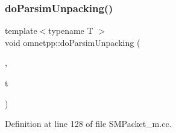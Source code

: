 \subsubsection{\texorpdfstring{do\+Parsim\+Unpacking()}{doParsimUnpacking()}\hspace{0.1cm}{\footnotesize\ttfamily [5/5]}}
{\footnotesize\ttfamily template$<$typename T $>$ \\
void omnetpp\+::do\+Parsim\+Unpacking (\begin{DoxyParamCaption}\item[{omnetpp\+::c\+Comm\+Buffer $\ast$}]{,  }\item[{T \&}]{t }\end{DoxyParamCaption})}



Definition at line 128 of file S\+M\+Packet\+\_\+m.\+cc.

